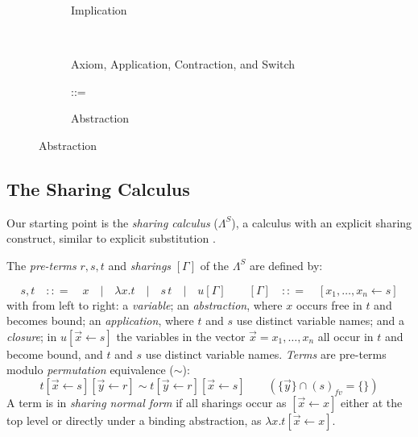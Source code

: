 \documentclass[a4paper,UKenglish,cleveref, autoref]{lipics-v2019}
\makeatletter
\newcommand{\SLC}{\Lambda^{S}}
\newcommand{\fv}[1]{(#1)_{fv}}
\newcommand{\set}[1]{ \{ #1 \} }
\newcommand{\abs}[2]{\lambda #1 . #2}
\newcommand{\app}[2]{#1 \, #2}
\newcommand{\share}[3]{#1 [#2 \leftarrow #3]}
\newcommand{\sharerule}{\triangle}
\newcommand{\apprule}{@}
\makeatother
\begin{document}
\begin{figure}[h]
	\begin{subfigure}[b]{0.2\textwidth}
	\centering
		{\small {}}
	\caption{Implication}
	\label{fig:implication}
	\end{subfigure}
	\hfill
	\begin{subfigure}[b]{0.3\textwidth}
		\centering
		{\small {}} \hspace{0.2cm}
		{\small \drv{(X \rightarrow Y) \wedge X ; -[\apprule] ; Y}} \\[0.2cm]
		{\small \drv{X ; -[\sharerule] ; X \wedge \dots \wedge X}} \hspace{0.1cm}
		{\small {}}
	\caption{Axiom, Application, Contraction, and Switch}
	\label{fig:inference}
	\end{subfigure}
	\hfill
	\begin{subfigure}[b]{0.4\textwidth}
	\centering
	{\small {}} {:}{:}{=} {\small {}}
	\caption{Abstraction}
	\label{fig:abstraction}
	\end{subfigure}
\end{figure}

\subsection{The Sharing Calculus}

Our starting point is the \emph{sharing calculus} ($\SLC$), a calculus with an explicit sharing construct, similar to explicit substitution \cite{levy1991}.

\begin{definition}
\label{def:sharingcalsyntax}
The \emph{pre-terms} $r, s, t$ and \emph{sharings} $[\Gamma]$ of the $\SLC$ are defined by:

$$s, t \quad {:}{:}{=} \quad x \quad \vert \quad \abs{x}{t} \quad \vert \quad \app{s}{t} \quad \vert \quad u[\Gamma] \quad \quad [\Gamma] \quad {:}{:}{=} \quad \share{}{x_{1}, \dots, x_{n}}{s}$$
with from left to right: a \emph{variable}; an \emph{abstraction}, where $x$ occurs free in $t$ and becomes bound; an \emph{application}, where $t$ and $s$ use distinct variable names; and a \emph{closure}; in $\share{u}{\vec{x}}{s}$ the variables in the vector $\vec{x} = x_{1}, \dots, x_{n}$ all occur in $t$ and become bound, and $t$ and $s$ use distinct variable names. \emph{Terms} are pre-terms modulo \emph{permutation} equivalence ($\sim$):
$$\share{t}{\vec{x}}{s} \share{}{\vec{y}}{r} \sim t \share{}{\vec{y}}{r} \share{}{\vec{x}}{s} \quad \quad (\set{\vec{y}} \cap \fv{s} = \set{} )$$
A term is in \emph{sharing normal form} if all sharings occur as $\share{}{\vec{x}}{x}$ either at the top level or directly under a binding abstraction, as $\abs{x}{\share{t}{\vec{x}}{x}}$.
\end{definition} 
\end{document}
